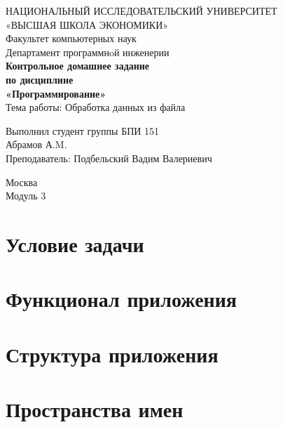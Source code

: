 \documentclass[twoside]{article}
\newcommand{\+}{\discretionary{\mbox{\scriptsize$\hookleftarrow$}}{}{}}
\begin{document}
\begin{titlepage}
\begin{center}
\vspace*{7cm}
{\large НАЦИОНАЛЬНЫЙ ИССЛЕДОВАТЕЛЬСКИЙ УНИВЕРСИТЕТ \\
«ВЫСШАЯ ШКОЛА ЭКОНОМИКИ» }\\
\vspace*{0.5cm}
{\large Факультет компьютерных наук }\\
\vspace*{0.5cm}
{\small Департамент программнoй инженерии \\
}
\vfill %
{\large\textbf{
Контрольное домашнее задание \\
по дисциплине\\
«Программирование» \\
}}
\bigskip
{\large Тема работы: Обработка данных из файла }\\
\vfill
\begin{flushright}
Выполнил студент группы БПИ 151 \\
Абрамов А.M. \\
Преподаватель: Подбельский Вадим Валериевич \\
\end{flushright}
\vfill
Москва \number\year \\
Модуль 3
\end{center}
\end{titlepage}

\tableofcontents
{}

\section{Условие задачи}

\section{Функционал приложения}

\section{Структура приложения}


\section{Пространства имен}

\end{document}
